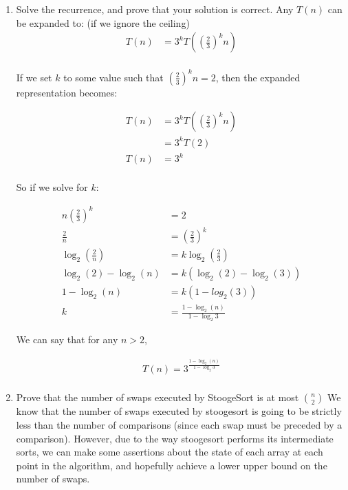 \documentclass{article}
\begin{document}
\begin{enumerate}
\begin{enumerate}
    \item 
    Solve the recurrence, and prove that your solution is correct. 
    Any $T(n)$ can be expanded to: (if we ignore the ceiling)
    \begin{align*}
      T(n) &= 3^k T(\left(\frac{2}{3}\right)^k n)\\
    \end{align*}

    If we set $k$ to some value such that $\left(\frac{2}{3}\right)^k n = 2$, then the expanded representation becomes:

    \begin{align*}
      T(n) &= 3^k T(\left(\frac{2}{3}\right)^k n)\\
      &= 3^k T(2)\\
      T(n) &= 3^k\\
    \end{align*}

    So if we solve for $k$:
    
    \begin{align*}
      n \left(\frac{2}{3}\right)^k &= 2\\
      \frac{2}{n} &= \left(\frac{2}{3}\right)^k\\
      \log_2\left(\frac{2}{n}\right) &= k \log_2\left(\frac{2}{3}\right)\\
      \log_2(2) - \log_2(n) &= k\left(\log_2(2) - \log_2(3)\right)\\
      1 - \log_2(n) &= k\left(1 - log_2(3)\right)\\
      k &= \frac{1 - \log_2(n)}{1 - \log_2{3}}
    \end{align*}

    We can say that for any $n > 2$,

    \begin{align*}
      T(n) = 3^{\frac{1 - \log_2(n)}{1 - \log_2{3}}}\\
    \end{align*}

    \item
    Prove that the number of swaps executed by StoogeSort is at most $n \choose 2$
We know that the number of swaps executed by stoogesort is going to be strictly less than the number of comparisons (since each swap must be preceded by a comparison). However, due to the way stoogesort performs its intermediate sorts, we can make some assertions about the state of each array at each point in the algorithm, and hopefully achieve a lower upper bound on the number of swaps.


\end{enumerate}
\end{enumerate}
\end{document}
